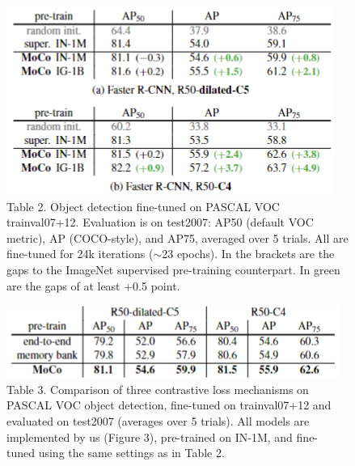 \documentclass[10pt,twocolumn]{article}  %
\begin{document}
\begin{figure}[t!]
    \centering
    \includegraphics[width=1\linewidth]{Pic/table2.png} %
    \captionsetup{labelformat=empty}
    \caption{Table 2. Object detection ﬁne-tuned on PASCAL VOC
    trainval07+12. Evaluation is on test2007: AP50 (default
    VOC metric), AP (COCO-style), and AP75, averaged over 5 trials.
    All are ﬁne-tuned for 24k iterations ($\sim $23 epochs). In the brackets
    are the gaps to the ImageNet supervised pre-training counterpart.
    In green are the gaps of at least +0.5 point.} %
    \label{fig:Table 2} %
    \vspace{-1em}
\end{figure}
\begin{figure}[t!]
    \centering
    \includegraphics[width=1\linewidth]{Pic/table3.png} %
    \captionsetup{labelformat=empty}
    \caption{Table 3. Comparison of three contrastive loss mechanisms on
    PASCAL VOC object detection, ﬁne-tuned on trainval07+12
    and evaluated on test2007 (averages over 5 trials). All models
    are implemented by us (Figure 3), pre-trained on IN-1M, and ﬁne-
    tuned using the same settings as in Table 2.} %
    \label{fig:Table 3} %
    \vspace{-1em}
\end{figure}
\end{document}
